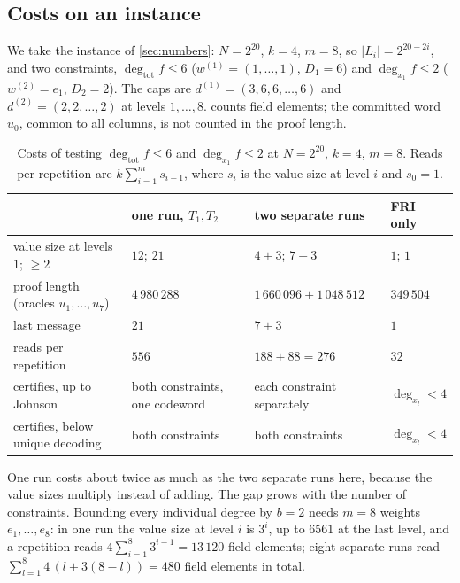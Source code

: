 \subsection{Costs on an instance}\label{sec:costs}

We take the instance of \cref{sec:numbers}: $N=2^{20}$, $k=4$, $m=8$, so $|L_i|=2^{20-2i}$,
and two constraints, $\deg_{\mathrm{tot}}f\le6$ ($w^{(1)}=(1,\dots,1)$, $D_1=6$) and
$\deg_{x_1}f\le2$ ($w^{(2)}=e_1$, $D_2=2$). The caps are $d^{(1)}=(3,6,6,\dots,6)$ and
$d^{(2)}=(2,2,\dots,2)$ at levels $1,\dots,8$.  counts field elements; the
committed word $u_0$, common to all columns, is not counted in the proof length.

\begin{table}[ht]
\centering\small
\renewcommand{\arraystretch}{1.2}
\begin{tabular}{@{}p{4.2cm}p{2.9cm}p{3.2cm}p{2.4cm}@{}}
\hline
 & one run, $T_1,T_2$ & two separate runs & FRI only\\
\hline
value size at levels $1$; $\ge2$ & $12$; $21$ & $4+3$; $7+3$ & $1$; $1$\\
proof length (oracles $u_1,\dots,u_7$) & $4\,980\,288$ & $1\,660\,096+1\,048\,512$ & $349\,504$\\
last message & $21$ & $7+3$ & $1$\\
reads per repetition & $556$ & $188+88=276$ & $32$\\
certifies, up to Johnson & both constraints, one codeword & each constraint separately & $\deg_{x_l}<4$\\
certifies, below unique decoding & both constraints & both constraints & $\deg_{x_l}<4$\\
\hline
\end{tabular}
\caption{Costs of testing $\deg_{\mathrm{tot}}f\le6$ and $\deg_{x_1}f\le2$ at $N=2^{20}$,
$k=4$, $m=8$. Reads per repetition are $k\sum_{i=1}^m s_{i-1}$, where $s_i$ is the value size
at level $i$ and $s_0=1$.}
\label{tab:costs}
\end{table}

One run costs about twice as much as the two separate runs here, because the value sizes
multiply instead of adding. The gap grows with the number of constraints. Bounding every
individual degree by $b=2$ needs $m=8$ weights $e_1,\dots,e_8$: in one run the value size at
level $i$ is $3^i$, up to $6561$ at the last level, and a repetition reads
$4\sum_{i=1}^{8}3^{i-1}=13\,120$ field elements; eight separate runs read
$\sum_{l=1}^{8}4\,(l+3(8-l))=480$ field elements in total.

